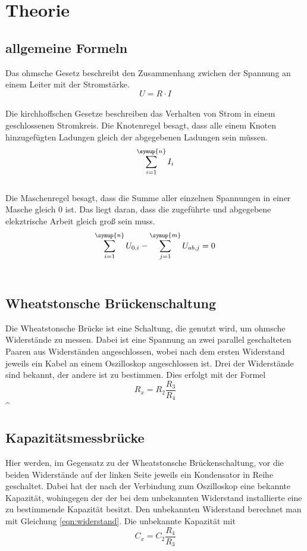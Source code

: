 \section{Theorie}
\label{sec:Theorie}
    \subsection{allgemeine Formeln}
    Das ohmsche Gesetz beschreibt den Zusammenhang zwichen der Spannung an einem Leiter mit der Stromstärke.
    \begin{equation}
        U=R \cdot I
        \label{eqn:ohm}
    \end{equation}\\
    Die kirchhoffschen Gesetze beschreiben das Verhalten von Strom in einem geschlossenen Stromkreis.
    Die Knotenregel besagt, dass alle einem Knoten hinzugefügten Ladungen gleich der abgegebenen Ladungen sein müssen.
    \begin{equation}
        \sum_{i=1}^{\symup{n}}{I_i}
        \label{eqn:knoten}
    \end{equation}\\
    Die Maschenregel besagt, dass die Summe aller einzelnen Spannungen in einer Masche gleich 0 ist. 
    Das liegt daran, dass die zugeführte und abgegebene elekztrische Arbeit gleich groß sein muss.
    \begin{equation}
        \sum_{i=1}^{\symup{n}}{U_{0,i}} - \sum_{j=1}^{\symup{m}}{U_{ab,j}} =0
        \label{eqn:masche}
    \end{equation}\\

    \subsection{Wheatstonsche Brückenschaltung}
    Die Wheatstonsche Brücke ist eine Schaltung, die genutzt wird, um ohmsche Widerstände zu messen.
    Dabei ist eine Spannung an zwei parallel geschalteten Paaren aus Widerständen angeschlossen, wobei nach dem ersten Widerstand jeweils ein Kabel an einem Oszilloskop angeschlossen ist.
    Drei der Widerstände sind bekannt, der andere ist zu bestimmen.
    Dies erfolgt mit der Formel
    \begin{equation}
        R_x=R_2 \frac{R_3}{R_4}
        \label{eqn:widerstand}
    \end{equation}^

    \subsection{Kapazitätsmessbrücke}
    Hier werden, im Gegensatz zu der Wheatstonsche Brückenschaltung, vor die beiden Widerstände auf der linken Seite jeweils ein Kondensator in Reihe geschaltet.
    Dabei hat der nach der Verbindung zum Oszilloskop eine bekannte Kapazität, wohingegen der der bei dem unbekannten Widerstand installierte eine zu bestimmende Kapazität besitzt.
    Den unbekannten Widerstand berechnet man mit Gleichung \ref{eqn:widerstand}.
    Die unbekannte Kapazität mit 
    \begin{equation}
        C_x=C_2 \frac{R_4}{R_3}
        \label{eqn:kapazität}
    \end{equation}

